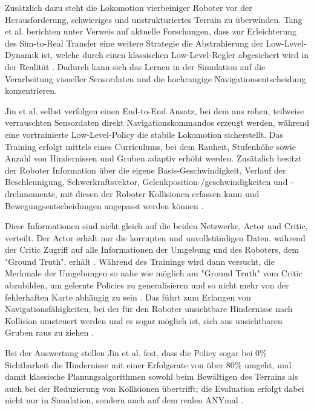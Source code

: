 Zusätzlich dazu steht die Lokomotion vierbeiniger Roboter vor der Herausforderung, schwieriges und unstrukturiertes Terrain zu überwinden. Tang et al. berichten unter Verweis auf aktuelle Forschungen, dass zur Erleichterung des Sim-to-Real Transfer eine weitere Strategie die Abstrahierung der Low-Level-Dynamik ist, welche durch einen klassischen Low-Level-Regler abgesichert wird in der Realität \cite{tangDeepReinforcementLearning2024}. Dadurch kann sich das Lernen in der Simulation auf die Verarbeitung visueller Sensordaten und die hochrangige Navigationsentscheidung konzentrieren.

Jin et al. \cite{jinResilientLeggedLocal2023} selbst verfolgen einen End-to-End Ansatz, bei dem aus rohen, teilweise verrauschten Sensordaten direkt Navigationskommandos erzeugt werden, während eine vortrainierte Low-Level-Policy die stabile Lokomotion sicherstellt. Das Training erfolgt mittels eines Curriculums, bei dem Rauheit, Stufenhöhe sowie Anzahl von Hindernissen und Gruben adaptiv erhöht werden. Zusätzlich besitzt der Roboter Information über die eigene Basis-Geschwindigkeit, Verlauf der Beschleunigung, Schwerkraftsvektor, Gelenkposition-/geschwindigkeiten und -drehmomente, mit diesen der Roboter Kollisionen erfassen kann und Bewegungsentscheidungen angepasst werden können \cite{jinResilientLeggedLocal2023}.

Diese Informationen sind nicht gleich auf die beiden Netzwerke, Actor und Critic, verteilt. Der Actor erhält nur die korrupten und unvollständigen Daten, während der Critic Zugriff auf alle Informationen der Umgebung und des Roboters, dem "Ground Truth", erhält \cite{jinResilientLeggedLocal2023}. Während des Trainings wird dann versucht, die Merkmale der Umgebungen so nahe wie möglich am "Ground Truth" vom Critic abzubilden, um gelernte Policies zu generalisieren und so nicht mehr von der fehlerhaften Karte abhängig zu sein \cite{jinResilientLeggedLocal2023}. Das führt zum Erlangen von Navigationsfähigkeiten, bei der für den Roboter unsichtbare Hindernisse nach Kollision umsteuert werden und es sogar möglich ist, sich aus unsichtbaren Gruben raus zu ziehen \cite{jinResilientLeggedLocal2023}. 

Bei der Auswertung stellen Jin et al. fest, dass die Policy sogar bei 0\% Sichtbarkeit die Hindernisse mit einer Erfolgsrate von über 80\% umgeht, und damit klassische Planungsalgorithmen sowohl beim Bewältigen des Terrains als auch bei der Reduzierung von Kollisionen übertrifft; die Evaluation erfolgt dabei nicht nur in Simulation, sondern auch auf dem realen ANYmal \cite{jinResilientLeggedLocal2023}.

